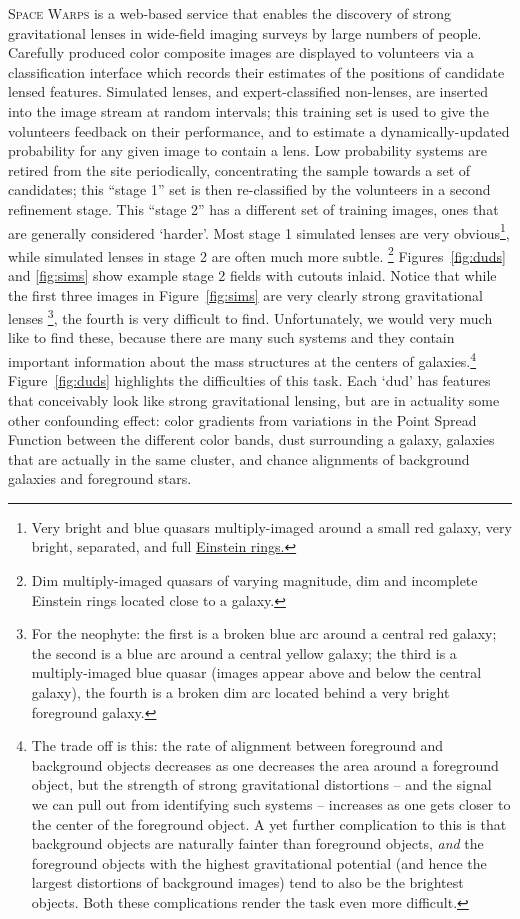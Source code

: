 \documentclass[10pt,twocolumn,letterpaper]{article}
\begin{document}
\textsc{Space Warps} is a web-based service that enables the discovery of
strong gravitational lenses in wide-field imaging surveys by large numbers of
people. Carefully produced color composite images are displayed to volunteers
via a classification interface which records their estimates of the positions
of candidate lensed features. Simulated lenses, and expert-classified
non-lenses, are inserted into the image stream at random intervals; this
training set is used to give the volunteers feedback on their performance, and
to estimate a dynamically-updated probability for any given image to contain a
lens. Low probability systems are retired from the site periodically,
concentrating the sample towards a set of candidates; this ``stage 1'' set is
then re-classified by the volunteers in a second refinement stage. This ``stage
2'' has a different set of training images, ones that are generally considered
`harder'. Most stage 1 simulated lenses are very obvious\footnote{Very bright
and blue quasars multiply-imaged around a small red galaxy, very bright,
separated, and full \href{http://en.wikipedia.org/wiki/Einstein_ring}{Einstein
rings.}}, while simulated lenses in stage 2 are often much more subtle.
\footnote{Dim multiply-imaged quasars of varying magnitude, dim and incomplete
Einstein rings located close to a galaxy.} Figures~\ref{fig:duds} and
\ref{fig:sims}\xspace show example stage 2 fields with cutouts inlaid. Notice
that while the first three images in Figure~\ref{fig:sims} are very clearly
strong gravitational lenses \footnote{For the neophyte: the first is a broken
  blue arc around a central red galaxy; the second is a blue arc around a
  central yellow galaxy; the third is a multiply-imaged blue quasar (images
appear above and below the central galaxy), the fourth is a broken dim arc
located behind a very bright foreground galaxy.}, the fourth is very difficult
to find.  Unfortunately, we would very much like to find these, because there
are many such systems and they contain important information about the mass
structures at the centers of galaxies.\footnote{The trade off is this: the rate
  of alignment between foreground and background objects decreases as one
  decreases the area around a foreground object, but the strength of strong
  gravitational distortions -- and the signal we can pull out from identifying
  such systems -- increases as one gets closer to the center of the foreground
  object. A yet further complication to this is that background objects are
  naturally fainter than foreground objects, \textit{and} the foreground
  objects with the highest gravitational potential (and hence the largest
distortions of background images) tend to also be the brightest objects. Both
these complications render the task even more difficult.}
Figure~\ref{fig:duds} highlights the difficulties of this task. Each `dud' has
features that conceivably look like strong gravitational lensing, but are in
actuality some other confounding effect: color gradients from variations in the
Point Spread Function between the different color bands, dust surrounding a
galaxy, galaxies that are actually in the same cluster, and chance alignments
of background galaxies and foreground stars.
\end{document}
